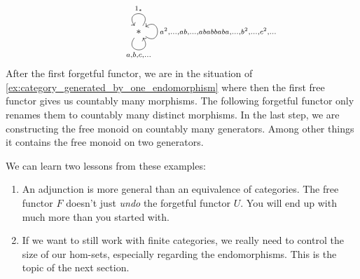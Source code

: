 \begin{example}
\[\begin{minipage}{.25\textwidth}
\begin{tikzcd}
\ast \arrow["{a, b, c,\dots}"', loop, distance=2em, in=305, out=235] \arrow["1_{\ast}"', loop, distance=2em, in=125, out=55] \arrow["{a^{2},\dots,ab,\dots,ababbaba,\dots,b^{2},\dots,c^{2},\dots}"', loop, distance=2em, in=35, out=325]
\end{tikzcd}
\end{minipage}
\begin{minipage}{.10\textwidth}
\phantom{}
\end{minipage}
\]
After the first forgetful functor, we are in the situation of \ref{ex:category_generated_by_one_endomorphism} where then the first free functor
gives us countably many morphisms.
The following forgetful functor only renames them to countably many distinct morphisms.
In the last step, we are constructing the free monoid on countably many generators. Among other things it contains the free monoid on two
generators.
\end{example}

We can learn two lessons from these examples:
\begin{enumerate}
\item An adjunction is more general than an equivalence of categories. The free functor $F$ doesn't just \textit{undo} the forgetful functor $U$.
You will end up with much more than you started with.
\item If we want to still work with finite categories, we really need to control the size of our hom-sets, especially regarding the endomorphisms.
This is the topic of the next section.
\end{enumerate}

\vspace{4em}

